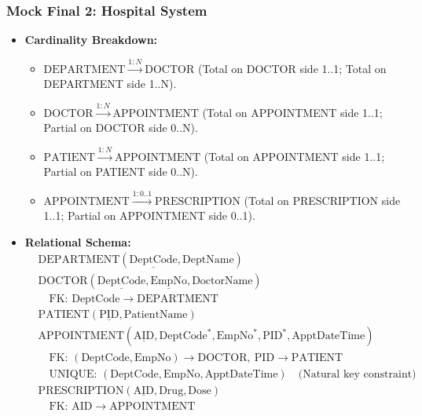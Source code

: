 \documentclass[10pt,a4paper]{article}
\begin{document}
\subsubsection*{Mock Final 2: Hospital System}
\begin{itemize}
  \item \textbf{Cardinality Breakdown:}
  \begin{itemize}
    \item $\mathrm{DEPARTMENT} \xrightarrow{1:N} \mathrm{DOCTOR}$ (Total on DOCTOR side 1..1; Total on DEPARTMENT side 1..N).
    \item $\mathrm{DOCTOR} \xrightarrow{1:N} \mathrm{APPOINTMENT}$ (Total on APPOINTMENT side 1..1; Partial on DOCTOR side 0..N).
    \item $\mathrm{PATIENT} \xrightarrow{1:N} \mathrm{APPOINTMENT}$ (Total on APPOINTMENT side 1..1; Partial on PATIENT side 0..N).
    \item $\mathrm{APPOINTMENT} \xrightarrow{1:0..1} \mathrm{PRESCRIPTION}$ (Total on PRESCRIPTION side 1..1; Partial on APPOINTMENT side 0..1).
  \end{itemize}
  \item \textbf{Relational Schema:}
  \begin{align*}
    &\mathrm{DEPARTMENT}(\underline{\mathrm{DeptCode}}, \mathrm{DeptName})\\
    &\mathrm{DOCTOR}(\underline{\mathrm{DeptCode}}, \underline{\mathrm{EmpNo}}, \mathrm{DoctorName})\\
    &\quad \text{FK: } \mathrm{DeptCode} \to \mathrm{DEPARTMENT}\\
    &\mathrm{PATIENT}(\underline{\mathrm{PID}}, \mathrm{PatientName})\\
    &\mathrm{APPOINTMENT}(\underline{\mathrm{AID}}, \mathrm{DeptCode}^*, \mathrm{EmpNo}^*, \mathrm{PID}^*, \mathrm{ApptDateTime})\\
    &\quad \text{FK: } (\mathrm{DeptCode}, \mathrm{EmpNo}) \to \mathrm{DOCTOR},\ \mathrm{PID} \to \mathrm{PATIENT}\\
    &\quad \text{UNIQUE: } (\mathrm{DeptCode}, \mathrm{EmpNo}, \mathrm{ApptDateTime}) \quad\text{(Natural key constraint)}\\
    &\mathrm{PRESCRIPTION}(\underline{\mathrm{AID}}, \mathrm{Drug}, \mathrm{Dose})\\
    &\quad \text{FK: } \mathrm{AID} \to \mathrm{APPOINTMENT}
  \end{align*}
\end{itemize}
\end{document}
